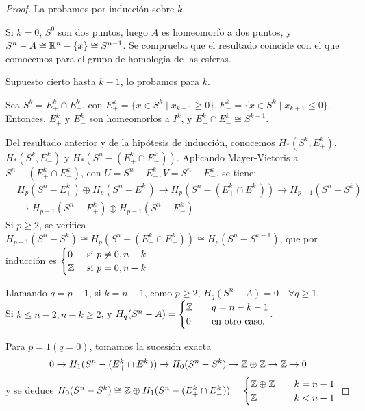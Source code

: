 \begin{proof}
  La probamos por inducción sobre $k$.

  Si $k = 0$, $S^0$ son dos puntos, luego $A$ es homeomorfo a dos puntos, y $S^n - A \cong \mathbb{R}^n - \{x\} \cong S^{n-1}$.
  Se comprueba que el resultado coincide con el que comocemos para el grupo de homología de las esferas.

  Supuesto cierto hasta $k - 1$, lo probamos para $k$.

  Sea $S^k = E_+^k \cap E_-^k$, con $E_+^k = \{x \in S^k \mid x_{k+1} \geq 0\}, E_-^k = \{x \in S^k \mid x_{k+1} \leq 0\}$.
  Entonces, $E_+^k$ y $E_-^k$ son homeomorfos a $I^k$, y $E_+^k \cap E_-^k \cong S^{k-1}$.

  Del resultado anterior y de la hipótesis de inducción, conocemos $H_*(S^k, E_+^k)$, $H_*(S^k, E_-^k)$ y $H_*(S^n - (E_+^k \cap E_-^k))$.
  Aplicando Mayer-Vietoris a $S^n - (E_+^k \cap E_-^k)$, con $U = S^n - E_+^k, V = S^n - E_-^k$, se tiene:
  \begin{align*}
    &H_p(S^n - E_+^k) \oplus H_p(S^n - E_-^k) \to H_p(S^n - (E_+^k \cap E_-^k)) \to H_{p-1}(S^n - S^k) \\
    &\to H_{p-1}(S^n - E_+^k) \oplus H_{p-1}(S^n - E_-^k)
  \end{align*}
  Si $p \geq 2$, se verifica $H_{p-1}(S^n - S^k) \cong H_p(S^n - (E_+^k \cap E_-^k)) \cong H_p(S^n - S^{k-1})$,
  que por inducción es $\begin{cases} 0 &\text{ si } p \neq 0, n-k \\ \mathbb{Z} &\text{ si } p = 0, n-k \end{cases}$

  Llamando $q = p-1$, si $k = n-1$, como $p \geq 2$, $H_q(S^n - A) = 0 \quad \forall q \geq 1$.\\
  Si $k \leq n-2, n-k \geq 2$, y $H_q(S^n - A) = \begin{cases} \mathbb{Z} &\quad q = n-k-1 \\ 0 &\quad \text{en otro caso.} \end{cases}$.

  Para $p = 1 (q = 0)$, tomamos la sucesión exacta
  \[0 \to H_1(S^n - (E_+^k \cap E_-^k)) \to H_0(S^n - S^k) \to \mathbb{Z} \oplus \mathbb{Z} \to \mathbb{Z} \to 0 \]
  y se deduce $H_0(S^n - S^k) \cong \mathbb{Z} \oplus H_1(S^n - (E_+^k \cap E_-^k)) = \begin{cases} \mathbb{Z} \oplus \mathbb{Z} &\quad k = n-1 \\
                                                                                                    \mathbb{Z} &\quad k < n - 1  \end{cases} $
\end{proof}

